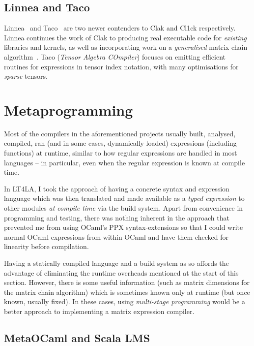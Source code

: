 \subsection{Linnea and Taco}

Linnea~\cite{linnea} and Taco~\cite{taco} are two newer contenders to Clak and
Cl1ck respectively. Linnea continues the work of Clak to producing real
executable code for \emph{existing} libraries and kernels, as well as
incorporating work on a \emph{generalised} matrix chain algorithm~\cite{gmc}.
Taco (\emph{Tensor Algebra COmpiler}) focuses on emitting efficient routines
for expressions in tensor index notation, with many optimisations for
\emph{sparse} tensors.

\section{Metaprogramming}

Most of the compilers in the aforementioned projects usually built, analysed,
compiled, ran (and in some cases, dynamically loaded) expressions (including
functions) at runtime, similar to how regular expressions are handled in most
languages -- in particular, even when the regular expression is known at
compile time.

In LT4LA, I took the approach of having a concrete syntax and expression
language which was then translated and made available as a \emph{typed
expression} to other modules \emph{at compile time} via the build system. Apart
from convenience in programming and testing, there was nothing inherent in the
approach that prevented me from using OCaml's PPX syntax-extensions so that I
could write normal OCaml expressions from within OCaml and have them checked
for linearity before compilation.

Having a statically compiled language and a build system as so affords the
advantage of eliminating the runtime overheads mentioned at the start of this
section. However, there is some useful information (such as matrix dimensions
for the matrix chain algorithm) which is sometimes known only at runtime (but
once known, usually fixed). In these cases, using \emph{multi-stage
programming} would be a better approach to implementing a matrix expression
compiler.

\subsection{MetaOCaml and Scala LMS}

